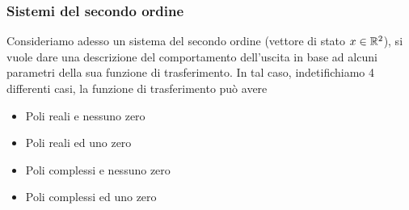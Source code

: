 \documentclass[10pt, letterpaper]{report}
\begin{document}
\subsubsection{Sistemi del secondo ordine}
Consideriamo adesso un sistema del secondo 
ordine (vettore di stato $x\in{\mathbb R}^2$), si vuole dare una 
descrizione del comportamento dell'uscita in base 
ad alcuni parametri della sua funzione di trasferimento. In tal 
caso, indetifichiamo 4 differenti casi, la 
funzione di trasferimento può 
avere
\begin{itemize}
    \item Poli reali e nessuno zero 
    \item Poli reali ed uno zero 
    \item Poli complessi e nessuno zero 
    \item Poli complessi ed uno zero
\end{itemize}
\end{document}
